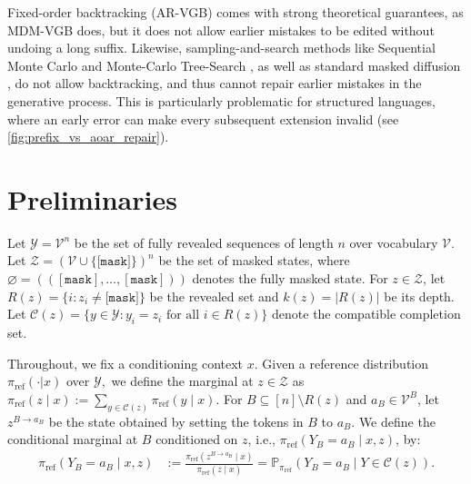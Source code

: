 \documentclass{article}
\numberwithin{theorem}{section}
\numberwithin{proposition}{section}
\numberwithin{corollary}{section}
\numberwithin{lemma}{section}
\numberwithin{conjecture}{section}
\numberwithin{remark}{section}
\numberwithin{definition}{section}
\numberwithin{assumption}{section}
\numberwithin{example}{section}
\newcommand{\calC}{{\mathcal{C}}}
\newcommand{\calV}{{\mathcal{V}}}
\newcommand{\calY}{{\mathcal{Y}}}
\newcommand{\calZ}{{\mathcal{Z}}}
\newcommand{\sbra}[1]{\left(#1\right)}
\providecommand{\mask}{\texttt{[mask]}}
\providecommand{\base}{\pi_{\mathrm{ref}}}
\begin{document}
 
Fixed-order backtracking (AR-VGB) \citep{sinclair1989approximate,rohatgi2025taming} comes with strong theoretical guarantees, as MDM-VGB does, but it does not allow earlier mistakes to be edited without undoing a long suffix. Likewise, sampling-and-search methods like Sequential Monte Carlo \citep{ou2025inference} and Monte-Carlo Tree-Search
\citep{ou2025inference,misaki2026unmaskfork}, as well as standard masked diffusion \citep{austin2021structured,sahoo2024simple,arriola2025block,lee2025test}, do not allow backtracking, and thus cannot repair earlier mistakes in the generative process. This is particularly problematic for structured languages, where an early error can make every subsequent extension invalid (see \cref{fig:prefix_vs_aoar_repair}).

\section{Preliminaries}

\label{main:sec:preliminaries}
\vspace{-10pt}

Let $\calY=\calV^n$ be the set of fully
revealed sequences of length $n$ over vocabulary $\calV.$ Let \(\calZ=(\calV\cup\{\mask\})^n\) be the set of masked states, where $\varnothing = \sbra{(\mathtt{[mask]},\ldots,\mathtt{[mask]})}$ denotes the fully masked state. 
For \(z\in\calZ\), let \(R(z)=\{i:z_i\neq\mask\}\) be the revealed set and \(k(z)=|R(z)|\) be its depth.
Let \(\calC(z)=\{y\in\calY: y_i=z_i \text{ for all } i\in R(z)\}\) denote the compatible completion set.

Throughout, we fix a conditioning context $x$. 
Given a reference distribution $\base(\cdot | x)$ over $\calY,$ we define the marginal at $z\in \calZ$ as $\base(z\mid x) := \sum_{y\in\calC(z) } \base(y\mid x).$ For \(B\subseteq[n]\setminus R(z)\) and \(a_B\in\calV^B\), let
\(z^{B\rightarrow a_B}\) be the state obtained by setting the tokens in \(B\) to $a_B.$ We define the conditional marginal at $B$ conditioned on $z$, i.e., $\base(Y_B=a_B\mid x,z)$, by: 
\begin{align*}
   \base(Y_B=a_B\mid x,z)
    &:= \frac{\base(z^{B\to a_B} \mid x)}{\base(z\mid x)} =
    \mathbb{P}_{\base}(Y_B=a_B\mid Y\in\calC(z)).
\end{align*}
\end{document}
